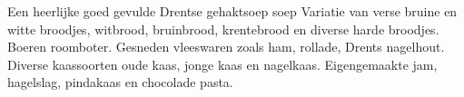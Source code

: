 Een heerlijke goed gevulde Drentse gehaktsoep soep
Variatie van verse bruine en witte broodjes,
 witbrood, bruinbrood, krentebrood en diverse harde broodjes.
Boeren roomboter.
Gesneden vleeswaren zoals ham, rollade, Drents nagelhout.
Diverse kaassoorten oude kaas, jonge kaas en nagelkaas.
Eigengemaakte jam, hagelslag, pindakaas en chocolade pasta.
